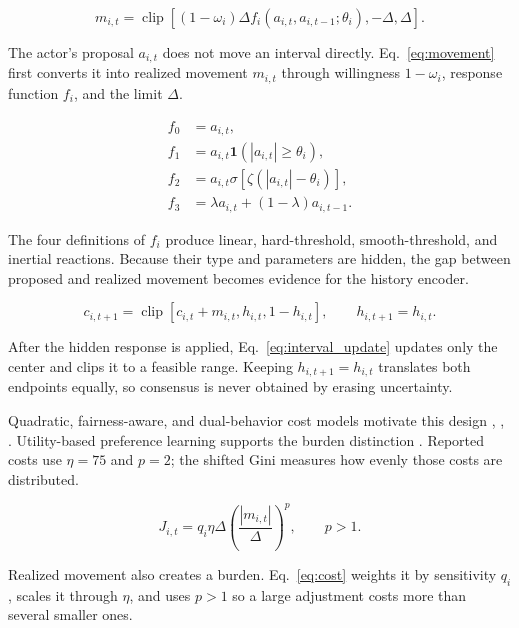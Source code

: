\documentclass[journal]{IEEEtran}
\newcommand{\clip}{\operatorname{clip}}
\newcommand{\eqnote}[1]{\par\vspace{-0.3ex}\noindent #1\par\vspace{0.4ex}}
\begin{document}
\begin{equation}
m_{i,t}=\clip\!\left[(1-\omega_i)\Delta
f_i(a_{i,t},a_{i,t-1};\theta_i),-\Delta,\Delta\right].
\label{eq:movement}
\end{equation}

\eqnote{The actor's proposal $a_{i,t}$ does not move an interval directly. Eq.~\eqref{eq:movement} first converts it into realized movement $m_{i,t}$ through willingness $1-\omega_i$, response function $f_i$, and the limit $\Delta$.}

\begin{equation}
\begin{aligned}
f_0&=a_{i,t},\\
f_1&=a_{i,t}\mathbf{1}(|a_{i,t}|\ge\theta_i),\\
f_2&=a_{i,t}\sigma\!\left[\zeta(|a_{i,t}|-\theta_i)\right],\\
f_3&=\lambda a_{i,t}+(1-\lambda)a_{i,t-1}.
\end{aligned}
\label{eq:responses}
\end{equation}

\eqnote{The four definitions of $f_i$ produce linear, hard-threshold, smooth-threshold, and inertial reactions. Because their type and parameters are hidden, the gap between proposed and realized movement becomes evidence for the history encoder.}

\begin{equation}
c_{i,t+1}=\clip[c_{i,t}+m_{i,t},h_{i,t},1-h_{i,t}],
\qquad h_{i,t+1}=h_{i,t}.
\label{eq:interval_update}
\end{equation}

\eqnote{After the hidden response is applied, Eq.~\eqref{eq:interval_update} updates only the center and clips it to a feasible range. Keeping $h_{i,t+1}=h_{i,t}$ translates both endpoints equally, so consensus is never obtained by erasing uncertainty.}

Quadratic, fairness-aware, and dual-behavior cost models motivate this design \cite{ref9}, \cite{ref10}, \cite{ref11}. Utility-based preference learning supports the burden distinction \cite{ref13}. Reported costs use $\eta=75$ and $p=2$; the shifted Gini measures how evenly those costs are distributed.

\begin{equation}
J_{i,t}=q_i\eta\Delta\left(\frac{|m_{i,t}|}{\Delta}\right)^p,
\qquad p>1.
\label{eq:cost}
\end{equation}

\eqnote{Realized movement also creates a burden. Eq.~\eqref{eq:cost} weights it by sensitivity $q_i$, scales it through $\eta$, and uses $p>1$ so a large adjustment costs more than several smaller ones.}
\end{document}
